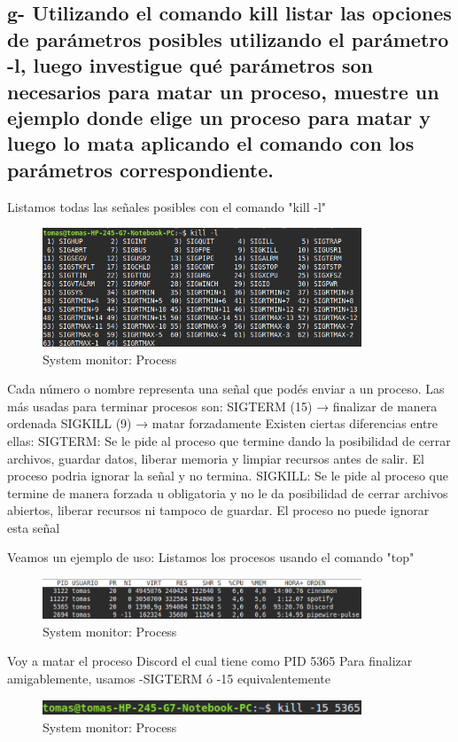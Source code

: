 \documentclass{article}
\begin{document}
\subsection*{g- Utilizando el comando kill listar las opciones de parámetros posibles utilizando el parámetro -l, luego
investigue qué parámetros son necesarios para matar un proceso, muestre un ejemplo donde elige
un proceso para matar y luego lo mata aplicando el comando con los parámetros correspondiente.}
Listamos todas las señales posibles con el comando "kill -l"
\begin{figure}[h]
  \centering
  \includegraphics[width=0.85\textwidth]{resources/4g1.png}
  \caption{System monitor: Process}
\end{figure}
Cada número o nombre representa una señal que podés enviar a un proceso.
	Las más usadas para terminar procesos son:
	SIGTERM (15) → finalizar de manera ordenada
	SIGKILL (9) → matar forzadamente
  Existen ciertas diferencias entre ellas: 
    SIGTERM: Se le pide al proceso que termine dando la posibilidad de cerrar archivos, guardar datos,
    liberar memoria y limpiar recursos antes de salir. El proceso podria ignorar la señal y no termina.
    SIGKILL: Se le pide al proceso que termine de manera forzada u obligatoria y no le da posibilidad de cerrar archivos abiertos,
    liberar recursos ni tampoco de guardar. El proceso no puede ignorar esta señal

    Veamos un ejemplo de uso:
    Listamos los procesos usando el comando "top"
    \begin{figure}[h]
      \centering
      \includegraphics[width=0.85\textwidth]{resources/4g2.png}
      \caption{System monitor: Process}
    \end{figure}

    Voy a matar el proceso Discord el cual tiene como PID 5365
    Para finalizar amigablemente, usamos -SIGTERM ó -15 equivalentemente
    \begin{figure}[h]
      \centering
      \includegraphics[width=0.85\textwidth]{resources/4g3.png}
      \caption{System monitor: Process}
    \end{figure}
\end{document}
